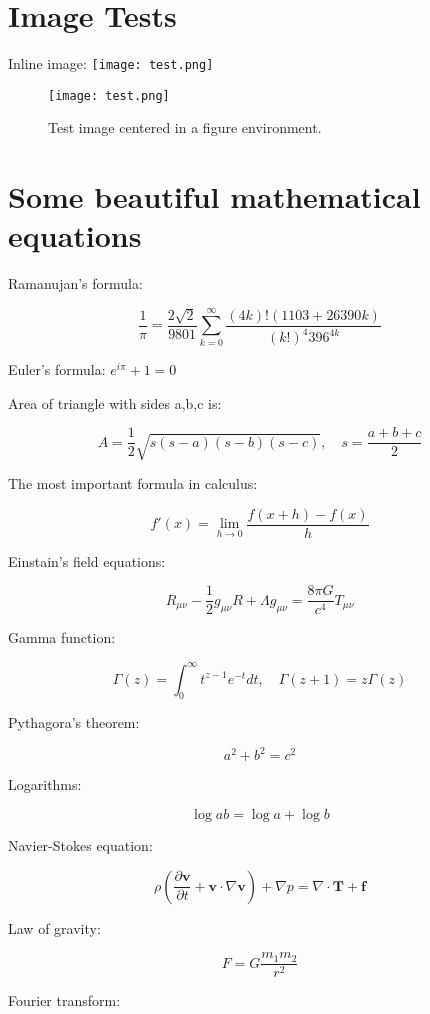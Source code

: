 \documentclass{article}
\begin{document}
\section{Image Tests}

Inline image: \texttt{[image: test.png]}

\begin{figure}[h]
    \centering
    \texttt{[image: test.png]}
    \caption{Test image centered in a figure environment.}
    \label{fig:test_image}
\end{figure}

\newpage

\section{Some beautiful mathematical equations}

Ramanujan's formula:

$$\frac{1}{\pi}=\frac{2\sqrt{2}}{9801}\sum_{k=0}^\infty\frac{(4k)! (1103+26390k)}{(k!)^4 396^{4k}}$$

Euler's formula: $e^{i\pi}+1=0$

Area of triangle with sides a,b,c is: 

$$A=\frac{1}{2} \sqrt{s(s-a)(s-b)(s-c)},\quad s=\frac{a+b+c}{2}$$

The most important formula in calculus:

\[
  f'(x)=\lim_{h\to 0}\frac{f(x+h)-f(x)}{h}
\]

Einstain's field equations:

\[
R_{\mu\nu}-\frac{1}{2}g_{\mu\nu}R+\Lambda g_{\mu\nu}=\frac{8\pi G}{c^4}T_{\mu\nu}
\]

Gamma function:

\[
  \Gamma(z) = \int_0^\infty t^{z-1} e^{-t} dt,\quad\Gamma(z+1) = z \Gamma(z)
\]

Pythagora's theorem:

$$a^2+b^2=c^2$$

Logarithms: 

$$\log ab=\log a+\log b$$

Navier-Stokes equation:

$$\rho\left(\frac{\partial \textbf{v}}{\partial t}+\textbf{v}\cdot\nabla\textbf{v}\right)+\nabla p=\nabla\cdot\textbf{T}+\textbf{f}$$

Law of gravity:

$$F=G\frac{m_1m_2}{r^2}$$

Fourier transform:
\end{document}
